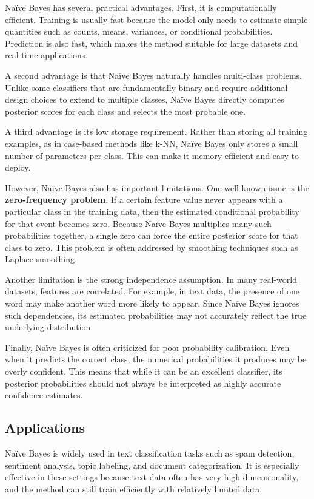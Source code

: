 \documentclass{article}
\begin{document}
Na\"ive Bayes has several practical advantages. First, it is computationally efficient. Training is usually fast because the model only needs to estimate simple quantities such as counts, means, variances, or conditional probabilities. Prediction is also fast, which makes the method suitable for large datasets and real-time applications.

A second advantage is that Na\"ive Bayes naturally handles multi-class problems. Unlike some classifiers that are fundamentally binary and require additional design choices to extend to multiple classes, Na\"ive Bayes directly computes posterior scores for each class and selects the most probable one.

A third advantage is its low storage requirement. Rather than storing all training examples, as in case-based methods like k-NN, Na\"ive Bayes only stores a small number of parameters per class. This can make it memory-efficient and easy to deploy.

However, Na\"ive Bayes also has important limitations. One well-known issue is the \textbf{zero-frequency problem}. If a certain feature value never appears with a particular class in the training data, then the estimated conditional probability for that event becomes zero. Because Na\"ive Bayes multiplies many such probabilities together, a single zero can force the entire posterior score for that class to zero. This problem is often addressed by smoothing techniques such as Laplace smoothing.

Another limitation is the strong independence assumption. In many real-world datasets, features are correlated. For example, in text data, the presence of one word may make another word more likely to appear. Since Na\"ive Bayes ignores such dependencies, its estimated probabilities may not accurately reflect the true underlying distribution.

Finally, Na\"ive Bayes is often criticized for poor probability calibration. Even when it predicts the correct class, the numerical probabilities it produces may be overly confident. This means that while it can be an excellent classifier, its posterior probabilities should not always be interpreted as highly accurate confidence estimates.

\subsection{Applications}

Na\"ive Bayes is widely used in text classification tasks such as spam detection, sentiment analysis, topic labeling, and document categorization. It is especially effective in these settings because text data often has very high dimensionality, and the method can still train efficiently with relatively limited data.
\end{document}
